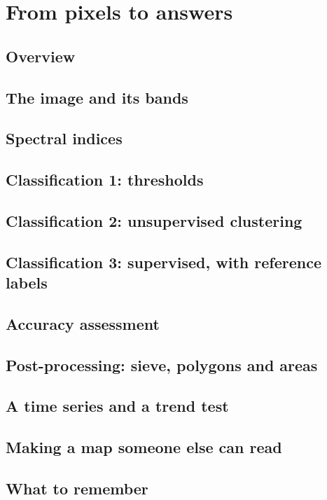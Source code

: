 \chapter{From pixels to answers}\label{ch:analysis}

\section{Overview}


\section{The image and its bands}


\section{Spectral indices}


\section{Classification 1: thresholds}


\section{Classification 2: unsupervised clustering}


\section{Classification 3: supervised, with reference labels}


\section{Accuracy assessment}


\section{Post-processing: sieve, polygons and areas}


\section{A time series and a trend test}


\section{Making a map someone else can read}


\section{What to remember}

